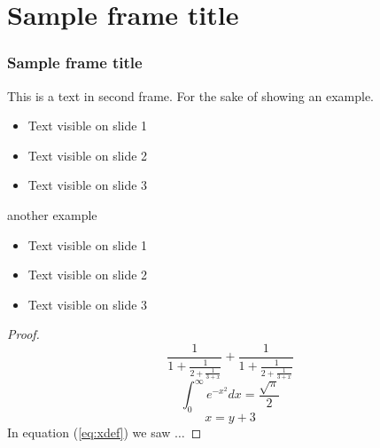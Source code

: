 \documentclass[aspectratio=169]{beamer}
\begin{document}
	\section{Sample frame title}
	
	
	\begin{frame}
		\frametitle{Sample frame title}
		This is a text in second frame.
		For the sake of showing an example.
		
		\begin{itemize}
			\item Text visible on slide 1
			\item Text visible on slide 2
			\item Text visible on slide 3
		\end{itemize}
		
		\vspace{0.3cm}
		
		another example
		
		\begin{itemize}\itemsep0em
			\item Text visible on slide 1
			\item Text visible on slide 2
			\item Text visible on slide 3
		\end{itemize}
	\end{frame}
	
	\begin{frame}
		\begin{proof}
			$$
			\frac{1}{\displaystyle 1+
				\frac{1}{\displaystyle 2+
					\frac{1}{\displaystyle 3+x}}} +
			\frac{1}{1+\frac{1}{2+\frac{1}{3+x}}}
			$$
			$$\int_0^\infty e^{-x^2} dx=\frac{\sqrt{\pi}}{2}$$
			\begin{equation} x=y+3 \label{eq:xdef}
			\end{equation}
			In equation (\ref{eq:xdef}) we saw $\dots$
		\end{proof}
	\end{frame}
	
	
\end{document}
